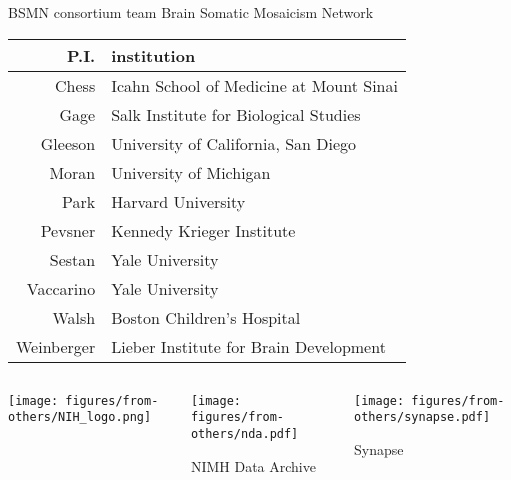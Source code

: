 \documentclass{beamer}
\begin{document}
\begin{frame}{BSMN consortium team}
Brain Somatic Mosaicism Network
\footnotesize
\begin{tabular}{rl}
\hline
P.I. & institution \\
\hline
\alert{Chess} & \alert{Icahn School of Medicine at Mount Sinai}\\
Gage & Salk Institute for Biological Studies\\
Gleeson & University of California, San Diego\\
Moran & University of Michigan\\
\alert{Park} & \alert{Harvard University}\\
Pevsner & Kennedy Krieger Institute\\
Sestan & Yale University\\
Vaccarino & Yale University\\
\alert{Walsh} & \alert{Boston Children's Hospital}\\
Weinberger & Lieber Institute for Brain Development\\
\end{tabular}
\vfill
\begin{columns}[t]
\begin{column}{0.3\textwidth}
\begin{center}

\texttt{[image: figures/from-others/NIH\_logo.png]}
\end{center}
\end{column}

\begin{column}{0.3\textwidth}
\begin{center}

\texttt{[image: figures/from-others/nda.pdf]}

NIMH Data Archive
\end{center}
\end{column}

\begin{column}{0.3\textwidth}
\begin{center}

\texttt{[image: figures/from-others/synapse.pdf]}

Synapse
\end{center}
\end{column}
\end{columns}
\end{frame}
\end{document}
